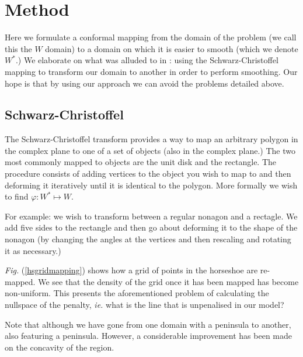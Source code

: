 \documentclass[a4paper,10pt]{amsart}
\newcommand{\sch}{Schwarz-Christoffel }
\newcommand{\Fig}[1]{\emph{Fig.} (\ref{#1})}
\renewcommand{\phi}{\varphi}
\begin{document}
\section{Method}

Here we formulate a conformal mapping from the domain of the problem (we call this the $W$ domain) to a domain on which it is easier to smooth (which we denote $W^*$.) We elaborate on what was alluded to in \cite{eilerstalk}: using the \sch mapping to transform our domain to another in order to perform smoothing. Our hope is that by using our approach we can avoid the problems detailed above.

\subsection{\sch}

The \sch transform provides a way to map an arbitrary polygon in the complex plane to one of a set of objects (also in the complex plane.) The two most commonly mapped to objects are the unit disk and the rectangle. The procedure consists of adding vertices to the object you wish to map to and then deforming it iteratively until it is identical to the polygon. More formally we wish to find $\phi: W^* \mapsto W$.

For example: we wish to transform between a regular nonagon and a rectagle. We add five sides to the rectangle and then go about deforming it to the shape of the nonagon (by changing the angles at the vertices and then rescaling and rotating it as necessary.) 

\Fig{hsgridmapping} shows how a grid of points in the horseshoe are re-mapped. We see that the density of the grid once it has been mapped has become non-uniform. This presents the aforementioned problem of calculating the nullspace of the penalty, \emph{ie.} what is the line that is unpenalised in our model?

Note that although we have gone from one domain with a peninsula to another, also featuring a peninsula. However, a considerable improvement has been made on the concavity of the region. 
\end{document}
